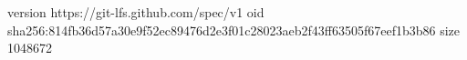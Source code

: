 version https://git-lfs.github.com/spec/v1
oid sha256:814fb36d57a30e9f52ec89476d2e3f01c28023aeb2f43ff63505f67eef1b3b86
size 1048672
